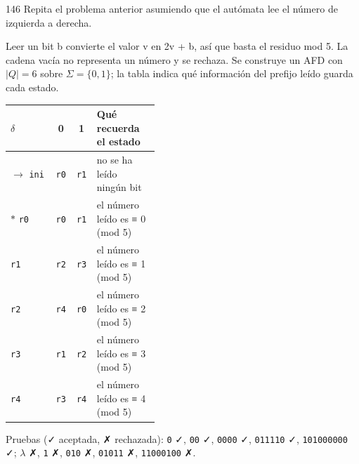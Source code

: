 \documentclass[11pt]{article}
\begin{document}
\begin{ejercicio}{146}{}
Repita el problema anterior asumiendo que el autómata lee el número de izquierda a derecha.
\end{ejercicio}
\proc Leer un bit b convierte el valor v en 2v + b, así que basta el residuo mod 5. La cadena vacía no representa un número y se rechaza. Se construye un AFD con $|Q| = 6$ sobre $\Sigma = \{0, 1\}$; la tabla indica qué información del prefijo leído guarda cada estado.
\begin{center}\small\begin{tabular}{lccp{0.42\linewidth}}\toprule
$\delta$ & 0 & 1 & Qué recuerda el estado \\\midrule
$\to$ \texttt{ini} & \texttt{r0} & \texttt{r1} & no se ha leído ningún bit \\
$*$ \texttt{r0} & \texttt{r0} & \texttt{r1} & el número leído es ≡ 0 (mod 5) \\
 \texttt{r1} & \texttt{r2} & \texttt{r3} & el número leído es ≡ 1 (mod 5) \\
 \texttt{r2} & \texttt{r4} & \texttt{r0} & el número leído es ≡ 2 (mod 5) \\
 \texttt{r3} & \texttt{r1} & \texttt{r2} & el número leído es ≡ 3 (mod 5) \\
 \texttt{r4} & \texttt{r3} & \texttt{r4} & el número leído es ≡ 4 (mod 5) \\
\bottomrule\end{tabular}\end{center}
Pruebas (✓ aceptada, ✗ rechazada): \texttt{0} ✓, \texttt{00} ✓, \texttt{0000} ✓, \texttt{011110} ✓, \texttt{101000000} ✓; $\lambda$ ✗, \texttt{1} ✗, \texttt{010} ✗, \texttt{01011} ✗, \texttt{11000100} ✗.
\end{document}
